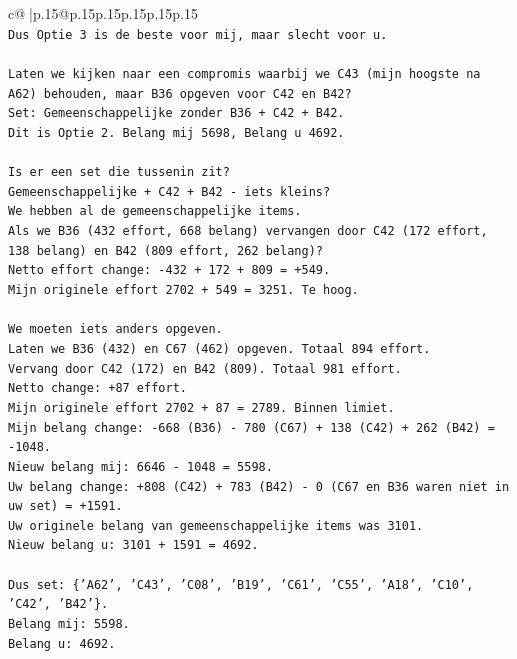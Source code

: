 \documentclass{article}
\begin{document}
{\begin{supertabular}{c@{$\;$}|p{.15\linewidth}@{}p{.15\linewidth}p{.15\linewidth}p{.15\linewidth}p{.15\linewidth}p{.15\linewidth}}
{{{\\ 
\texttt{Dus Optie 3 is de beste voor mij, maar slecht voor u.} \\
\\ 
\texttt{Laten we kijken naar een compromis waarbij we C43 (mijn hoogste na A62) behouden, maar B36 opgeven voor C42 en B42?} \\
\texttt{Set: Gemeenschappelijke zonder B36 + C42 + B42.} \\
\texttt{Dit is Optie 2. Belang mij 5698, Belang u 4692.} \\
\\ 
\texttt{Is er een set die tussenin zit?} \\
\texttt{Gemeenschappelijke + C42 + B42 {-} iets kleins?} \\
\texttt{We hebben al de gemeenschappelijke items.} \\
\texttt{Als we B36 (432 effort, 668 belang) vervangen door C42 (172 effort, 138 belang) en B42 (809 effort, 262 belang)?} \\
\texttt{Netto effort change: {-}432 + 172 + 809 = +549.} \\
\texttt{Mijn originele effort 2702 + 549 = 3251. Te hoog.} \\
\\ 
\texttt{We moeten iets anders opgeven.} \\
\texttt{Laten we B36 (432) en C67 (462) opgeven. Totaal 894 effort.} \\
\texttt{Vervang door C42 (172) en B42 (809). Totaal 981 effort.} \\
\texttt{Netto change: +87 effort.} \\
\texttt{Mijn originele effort 2702 + 87 = 2789. Binnen limiet.} \\
\texttt{Mijn belang change: {-}668 (B36) {-} 780 (C67) + 138 (C42) + 262 (B42) = {-}1048.} \\
\texttt{Nieuw belang mij: 6646 {-} 1048 = 5598.} \\
\texttt{Uw belang change: +808 (C42) + 783 (B42) {-} 0 (C67 en B36 waren niet in uw set) = +1591.} \\
\texttt{Uw originele belang van gemeenschappelijke items was 3101.} \\
\texttt{Nieuw belang u: 3101 + 1591 = 4692.} \\
\\ 
\texttt{Dus set: \{'A62', 'C43', 'C08', 'B19', 'C61', 'C55', 'A18', 'C10', 'C42', 'B42'\}.} \\
\texttt{Belang mij: 5598.} \\
\texttt{Belang u: 4692.} \\
}}}
\end{supertabular}}
\end{document}
